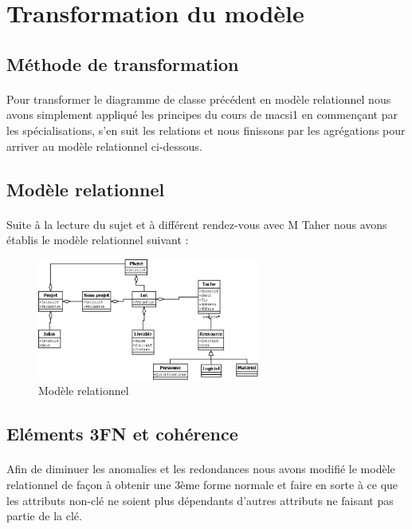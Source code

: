 \documentclass[a4paper, 12pt]{article}
\begin{document}
\newpage

\section{Transformation du modèle}
\subsection{Méthode de transformation}
\paragraph{}Pour transformer le diagramme de classe précédent en modèle relationnel nous avons simplement appliqué les principes du cours de macsi1 en commençant par les spécialisations, s'en suit les relations et nous finissons par les agrégations pour arriver au modèle relationnel ci-dessous.

\subsection{Modèle relationnel}
\paragraph{}Suite à la lecture du sujet et à différent rendez-vous avec M Taher nous avons établis le modèle relationnel suivant :

\begin{figure}[h!]
	\centering
	\includegraphics[height=4cm]{Classe.png}
	\caption{Modèle relationnel}
\end{figure}

\subsection{Eléments 3FN et cohérence}
\paragraph{} Afin de diminuer les anomalies et les redondances nous avons modifié le modèle relationnel de façon à obtenir une 3ème forme normale et faire en sorte à ce que les attributs non-clé ne soient plus dépendants d’autres attributs ne faisant pas partie de la clé.
\end{document}
